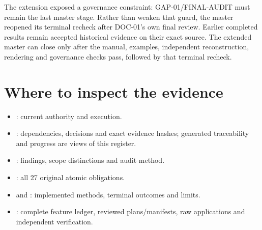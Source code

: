 The extension exposed a governance constraint: GAP-01/FINAL-AUDIT must remain
the last master stage. Rather than weaken that guard, the master reopened its
terminal recheck after DOC-01's own final review. Earlier completed results
remain accepted historical evidence on their exact source. The extended master
can close only after the manual, examples, independent reconstruction,
rendering and governance checks pass, followed by that terminal recheck.

\section{Where to inspect the evidence}

\begin{itemize}[leftmargin=*]
\item {}: current authority and execution.
\item {}: dependencies, decisions and exact
evidence hashes; generated traceability and progress are views of this register.
\item {}: findings,
scope distinctions and audit method.
\item {}: all 27 original atomic obligations.
\item {} and :
implemented methods, terminal outcomes and limits.
\item {}:\newline
complete feature ledger, reviewed plans/manifests, raw applications and
independent verification.
\end{itemize}
